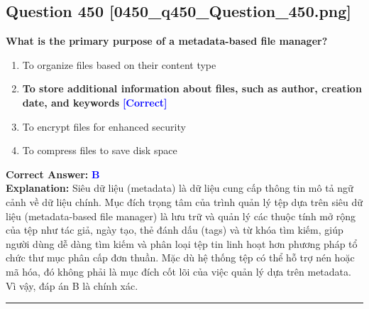 \documentclass[11pt,a4paper]{article}
\begin{document}
\begin{minipage}{\textwidth}
\subsection*{Question 450 \quad \footnotesize{[0450\_q450\_Question\_450.png]}}
\noindent \textbf{What is the primary purpose of a metadata-based file manager?}

\begin{enumerate}[label=\Alph*.]
    \item To organize files based on their content type
    \item \textbf{To store additional information about files, such as author, creation date, and keywords} \hfill \textcolor{blue}{\textbf{[Correct]}}
    \item To encrypt files for enhanced security
    \item To compress files to save disk space
\end{enumerate}

\noindent \textbf{Correct Answer:} \textcolor{blue}{\textbf{B}} \\[2pt]
\noindent \textbf{Explanation:} Siêu dữ liệu (metadata) là dữ liệu cung cấp thông tin mô tả ngữ cảnh về dữ liệu chính. Mục đích trọng tâm của trình quản lý tệp dựa trên siêu dữ liệu (metadata-based file manager) là lưu trữ và quản lý các thuộc tính mở rộng của tệp như tác giả, ngày tạo, thẻ đánh dấu (tags) và từ khóa tìm kiếm, giúp người dùng dễ dàng tìm kiếm và phân loại tệp tin linh hoạt hơn phương pháp tổ chức thư mục phân cấp đơn thuần. Mặc dù hệ thống tệp có thể hỗ trợ nén hoặc mã hóa, đó không phải là mục đích cốt lõi của việc quản lý dựa trên metadata. Vì vậy, đáp án B là chính xác.

\par\vspace{0.3cm}
\hrule
\vspace{0.3cm}
\end{minipage}
\end{document}
